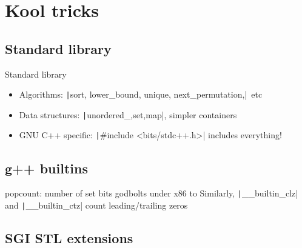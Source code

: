 \documentclass[12pt,presentation,hyperref={unicode},aspectratio=169]{beamer}
\begin{document}

\section{Kool tricks}

\subsection{Standard library}
\begin{frame}[fragile]{Standard library}
  \begin{itemize}
    \item<1-> Algorithms: \texttt|sort, lower_bound, unique, next_permutation,|~etc
    \item<1-> Data structures: \texttt|{unordered_,}{set,map}|,
      simpler containers
    \item<2-> GNU C++ specific:
        \texttt|#include <bits/stdc++.h>| includes everything!
  \end{itemize}
\end{frame}

\subsection{g++ builtins}

\begin{frame}[fragile]{popcount: number of set bits}
  godbolts under x86 to
  Similarly,
  \texttt|__builtin_clz| and \texttt|__builtin_ctz|
  count leading/trailing zeros
\end{frame}

\subsection{SGI STL extensions}

\end{document}
